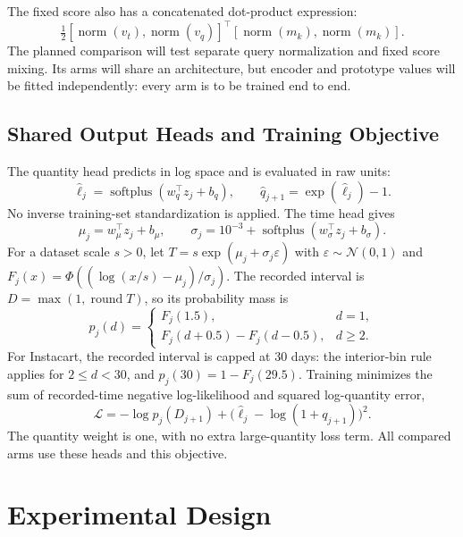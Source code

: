 \documentclass[runningheads]{llncs}
\newcommand{\softplus}{\operatorname{softplus}}
\newcommand{\Nrm}{\operatorname{norm}}
\begin{document}
The fixed score also has a concatenated dot-product expression:
\begin{equation}
 \tfrac12[\Nrm(v_t),\Nrm(v_q)]^\top[\Nrm(m_k),\Nrm(m_k)].
\end{equation}
The planned comparison will test separate query normalization and fixed score mixing. Its arms will share an architecture, but encoder and prototype values will be fitted independently: every arm is to be trained end to end.

\subsection{Shared Output Heads and Training Objective}
The quantity head predicts in log space and is evaluated in raw units:
\begin{equation}
 \widehat\ell_j=\softplus(w_q^\top z_j+b_q),\qquad
 \widehat q_{j+1}=\exp(\widehat\ell_j)-1.
\end{equation}
No inverse training-set standardization is applied. The time head gives
\begin{equation}
 \mu_j=w_\mu^\top z_j+b_\mu,\qquad
 \sigma_j=10^{-3}+\softplus(w_\sigma^\top z_j+b_\sigma).
\end{equation}
For a dataset scale $s>0$, let $T=s\exp(\mu_j+\sigma_j\varepsilon)$ with $\varepsilon\sim\mathcal N(0,1)$ and $F_j(x)=\Phi((\log(x/s)-\mu_j)/\sigma_j)$. The recorded interval is $D=\max(1,\operatorname{round}T)$, so its probability mass is
\begin{equation}
 p_j(d)=
 \begin{cases}
 F_j(1.5),& d=1,\\
 F_j(d+0.5)-F_j(d-0.5),& d\geq2.
 \end{cases}
 \label{eq:time}
\end{equation}
For Instacart, the recorded interval is capped at 30 days: the interior-bin rule applies for $2\leq d<30$, and $p_j(30)=1-F_j(29.5)$. Training minimizes the sum of recorded-time negative log-likelihood and squared log-quantity error,
\begin{equation}
 \mathcal L=-\log p_j(D_{j+1})+
   \bigl(\widehat\ell_j-\log(1+q_{j+1})\bigr)^2.
\end{equation}
The quantity weight is one, with no extra large-quantity loss term. All compared arms use these heads and this objective.

\section{Experimental Design}
\end{document}
